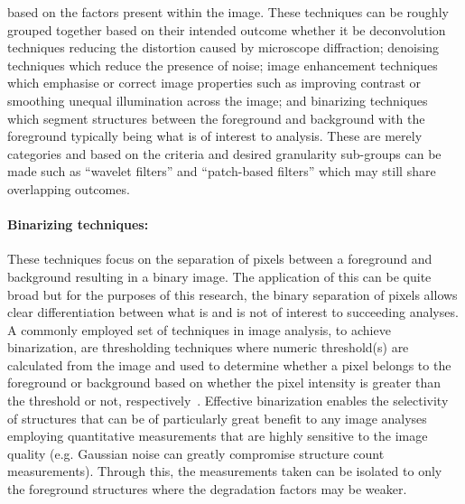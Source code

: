 based on the factors present within the image. These techniques can be roughly grouped together based on their intended outcome whether it be deconvolution techniques reducing the distortion caused by microscope diffraction; denoising techniques which reduce the presence of noise; image enhancement techniques which emphasise or correct image properties such as improving contrast or smoothing unequal illumination across the image; and binarizing techniques which segment structures between the foreground and background with the foreground typically being what is of interest to analysis. These are merely categories and based on the criteria and desired granularity sub-groups can be made such as ``wavelet filters'' and ``patch-based filters'' which may still share overlapping outcomes. 
\paragraph{Binarizing techniques:} 
These techniques focus on the separation of pixels between a foreground and background resulting in a binary image. The application of this can be quite broad but for the purposes of this research, the binary separation of pixels allows clear differentiation between what is and is not of interest to succeeding analyses. A commonly employed set of techniques in image analysis, to achieve binarization, are thresholding techniques where numeric threshold(s) are calculated from the image and used to determine whether a pixel belongs to the foreground or background based on whether the pixel intensity is greater than the threshold or not, respectively~\cite{segmentation_book}.
Effective binarization enables the selectivity of structures that can be of particularly great benefit to any image analyses employing quantitative measurements that are highly sensitive to the image quality (e.g. Gaussian noise can greatly compromise structure count measurements). Through this, the measurements taken can be isolated to only the foreground structures where the degradation factors may be weaker.
